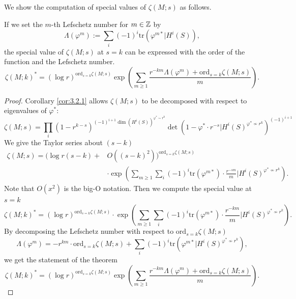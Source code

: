 We show the computation of special values of $\zeta(M;s)$ as follows.
\begin{theorem}
If we set the $m$-th Lefschetz number for $m\in{\mathbb{Z}}$ by 
\begin{equation*}
    \Lambda(\varphi^{m}):=\sum_{i}(-1)^{i}\mathrm{tr}(\varphi^{m*}|H^{i}(S)),
\end{equation*}        
the special value of $\zeta(M;s)$ at $s=k$ can be expressed  with the order of the function and the Lefschetz number.
\begin{equation*}
    \zeta(M;k)^{*}=(\log{r})^{\mathrm{ord}_{s=k}\zeta(M;s)}\exp(\sum_{m\ge1}\frac{r^{-km}\Lambda(\varphi^{m})+\mathrm{ord}_{s=k}\zeta(M;s)}{m}).
\end{equation*}
\end{theorem}
\begin{proof}
Corollary \ref{cor:3.2.1} allows $\zeta(M;s)$ to be decomposed with respect to eigenvalues of $\varphi^{*}$:
\begin{equation*}
    \zeta(M;s)=\prod_{i}(1-r^{k-s})^{(-1)^{i+1}\dim (H^{i}(S))^{\varphi^{*}\sim r^{k}}}\det(1-\varphi^{*}\cdot{r}^{-s}|H^{i}(S)^{\varphi^{*}\nsim r^{k}})^{(-1)^{i+1}}
\end{equation*}
We give the Taylor series about $(s-k)$
\begin{equation*}
    \begin{split}
    \zeta(M;s)=(\log{r}(s-k)+&O((s-k)^{2}))^{\mathrm{ord}_{s=k}\zeta(M;s)}\\
    &\cdot\exp(\sum_{m\ge1}\sum_{i}(-1)^{i}\mathrm{tr}(\varphi^{m*})\cdot \frac{r^{-sm}}{m}|H^{i}(S)^{\varphi^{*}\nsim r^{k}}).
    \end{split}
\end{equation*}
Note that $O(x^{2})$ is the big-O notation. Then we compute the special value at $s=k$
\begin{equation*}
    \zeta(M;k)^{*}=(\log{r})^{\mathrm{ord}_{s=k}\zeta(M;s)}\cdot\exp(\sum_{m\ge1}\sum_{i}(-1)^{i}\mathrm{tr}(\varphi^{m*})\cdot \frac{r^{-km}}{m}|H^{i}(S)^{\varphi^{*}\nsim r^{k}}).
\end{equation*}
By decomposing the Lefschetz number with respect to $\mathrm{ord}_{s=k}\zeta(M;s)$
\begin{equation*}
        \Lambda(\varphi^{m})=-r^{km}\cdot\mathrm{ord}_{s=k}\zeta(M;s)+\sum_{i}(-1)^{i}\mathrm{tr}(\varphi^{m*}|H^{i}(S)^{\varphi^{*}\nsim r^{k}}),
\end{equation*}
we get the statement of the theorem
\begin{equation*}
    \zeta(M;k)^{*}=(\log{r})^{\mathrm{ord}_{s=k}\zeta(M;s)}\exp(\sum_{m\ge1}\frac{r^{-km}\Lambda(\varphi^{m})+\mathrm{ord}_{s=k}\zeta(M;s)}{m}).
\end{equation*}
\end{proof}